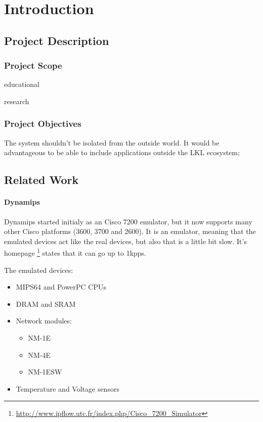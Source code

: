 \chapter{Introduction}
\label{chapter:intro}

\section{Project Description}
\label{sec:proj}

\project

\subsection{Project Scope}
\label{sub-sec:proj-scope}

educational

research

\subsection{Project Objectives}
\label{sub-sec:proj-objectives}

The system shouldn't be isolated from the outside world. It would be advantageous to be able
to include applications outside the LKL ecosystem;

\section{Related Work}
\label{sec:proj-related}

\subsubsection{Dynamips}

Dynamips started initialy as an Cisco 7200 emulator, but it now supports many other
Cisco platforms (3600, 3700 and 2600). It is an emulator, meaning that the emulated
devices act like the real devices, but also that is a little bit slow. It's
homepage \footnote{\url{http://www.ipflow.utc.fr/index.php/Cisco_7200_Simulator}}
states that it can go up to 1kpps. 

The emulated devices:
\begin{itemize}
  \item MIPS64 and PowerPC CPUs
  \item DRAM and SRAM
  \item Network modules:
    \begin{itemize}
      \item NM-1E
      \item NM-4E
      \item NM-1ESW
    \end{itemize}
  \item Temperature and Voltage sensors
\end{itemize}

